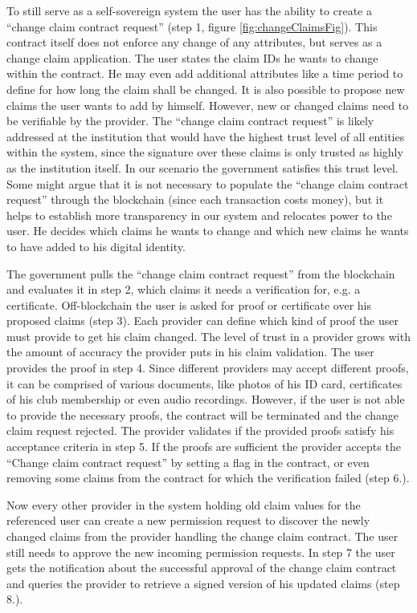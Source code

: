 To still serve as a self-sovereign system the user has the ability to create a “change claim contract request” (step 1, figure \ref{fig:changeClaimsFig}). This contract itself does not enforce any change of any attributes, but serves as a change claim application. The user states the claim IDs he wants to change within the contract. He may even add additional attributes like a time period to define for how long the claim shall be changed. It is also possible to propose new claims the user wants to add by himself. However, new or changed claims need to be verifiable by the provider. The “change claim contract request” is likely addressed at the institution that would have the highest trust level of all entities within the system, since the signature over these claims is only trusted as highly as the institution itself. In our scenario the government satisfies this trust level. Some might argue that it is not necessary to populate the “change claim contract request” through the blockchain (since each transaction costs money), but it helps to establish more transparency in our system and relocates power to the user. He decides which claims he wants to change and which new claims he wants to have added to his digital identity. 

The government pulls the “change claim contract request” from the blockchain and evaluates it in step 2, which claims it needs a verification for, e.g. a certificate. Off-blockchain the user is asked for proof or certificate over his proposed claims (step 3). Each provider can define which kind of proof the user must provide to get his claim changed. The level of trust in a provider grows with the amount of accuracy the provider puts in his claim validation. The user provides the proof in step 4. Since different providers may accept different proofs, it can be comprised of various documents, like photos of his ID card, certificates of his club membership or even audio recordings. However, if the user is not able to provide the necessary proofs, the contract will be terminated and the change claim request rejected.
The provider validates if the provided proofs satisfy his acceptance criteria in step 5.  If the proofs are sufficient the provider accepts the “Change claim contract request” by setting a flag in the contract, or even removing some claims from the contract for which the verification failed (step 6.). 

Now every other provider in the system holding old claim values for the referenced user can create a new permission request to discover the newly changed claims from the provider handling the change claim contract. The user still needs to approve the new incoming permission requests. In step 7 the user gets the notification about the successful approval of the change claim contract and queries the provider to retrieve a signed version of his updated claims (step 8.). 

